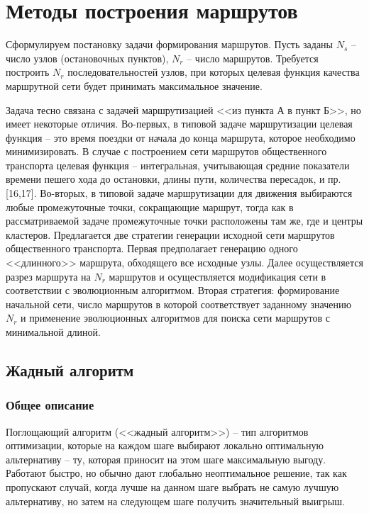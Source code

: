 \chapter{Методы построения маршрутов}
Сформулируем постановку задачи формирования маршрутов. Пусть заданы \( N_s \) – число узлов (остановочных 
пунктов), \( N_r \) – число маршрутов. Требуется построить \( N_r \) последовательностей узлов, при которых 
целевая функция качества маршрутной сети будет принимать максимальное значение. 

Задача тесно связана с задачей маршрутизацией <<из пункта А в пункт Б>>, но имеет некоторые отличия. 
Во-первых, в типовой задаче маршрутизации целевая функция – это время поездки от начала до конца маршрута, 
которое необходимо минимизировать. В случае с построением сети маршрутов общественного транспорта целевая 
функция -- интегральная, учитывающая средние показатели времени пешего хода до остановки, длины пути, 
количества пересадок, и пр. [16,17]. Во-вторых, в типовой задаче маршрутизации для движения выбираются 
любые промежуточные точки, сокращающие маршрут, тогда как в рассматриваемой задаче промежуточные точки 
расположены там же, где и центры кластеров.
Предлагается две стратегии генерации исходной сети маршрутов общественного транспорта. Первая предполагает 
генерацию одного <<длинного>> маршрута, обходящего все исходные узлы. Далее осуществляется разрез маршрута 
на \( N_r \) маршрутов и осуществляется модификация сети в соответствии с эволюционным алгоритмом. Вторая 
стратегия: формирование начальной сети, число маршрутов в которой соответствует заданному значению \( N_r \) 
и применение эволюционных алгоритмов для поиска сети маршрутов с минимальной длиной.

\section{Жадный алгоритм}
\subsection{Общее описание}
Поглощающий алгоритм (<<жадный алгоритм>>) -- тип алгоритмов оптимизации, которые на каждом шаге выбирают 
локально оптимальную альтернативу -- ту, которая приносит на этом шаге максимальную выгоду. Работают быстро, 
но обычно дают глобально неоптимальное решение, так как пропускают случай, когда лучше на данном шаге 
выбрать не самую лучшую альтернативу, но затем на следующем шаге получить значительный выигрыш.

